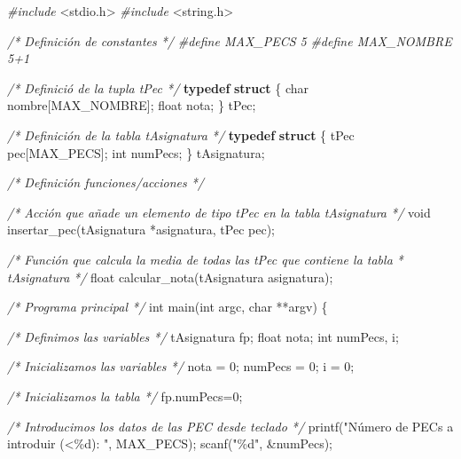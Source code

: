 \documentclass[
]{book}
\newenvironment{Shaded}{\begin{snugshade}}{\end{snugshade}}
\newcommand{\CommentTok}[1]{\textcolor[rgb]{0.56,0.35,0.01}{\textit{#1}}}
\newcommand{\DataTypeTok}[1]{\textcolor[rgb]{0.13,0.29,0.53}{#1}}
\newcommand{\DecValTok}[1]{\textcolor[rgb]{0.00,0.00,0.81}{#1}}
\newcommand{\ImportTok}[1]{#1}
\newcommand{\KeywordTok}[1]{\textcolor[rgb]{0.13,0.29,0.53}{\textbf{#1}}}
\newcommand{\NormalTok}[1]{#1}
\newcommand{\PreprocessorTok}[1]{\textcolor[rgb]{0.56,0.35,0.01}{\textit{#1}}}
\newcommand{\StringTok}[1]{\textcolor[rgb]{0.31,0.60,0.02}{#1}}
\begin{document}
\begin{Shaded}
\begin{Highlighting}[]
\PreprocessorTok{\#include }\ImportTok{\textless{}stdio.h\textgreater{}}
\PreprocessorTok{\#include }\ImportTok{\textless{}string.h\textgreater{}}

\CommentTok{/* Definición de constantes */}
\PreprocessorTok{\#define MAX\_PECS 5}
\PreprocessorTok{\#define MAX\_NOMBRE 5+1}

\CommentTok{/* Definició de la tupla tPec */}
\KeywordTok{typedef} \KeywordTok{struct}\NormalTok{ \{}
    \DataTypeTok{char}\NormalTok{ nombre[MAX\_NOMBRE];}
    \DataTypeTok{float}\NormalTok{ nota;}
\NormalTok{\} tPec;}

\CommentTok{/* Definición de la tabla tAsignatura */}
\KeywordTok{typedef} \KeywordTok{struct}\NormalTok{ \{}
\NormalTok{    tPec pec[MAX\_PECS];}
    \DataTypeTok{int}\NormalTok{ numPecs;}
\NormalTok{\} tAsignatura;}

\CommentTok{/* Definición funciones/acciones */}

\CommentTok{/* Acción que añade un elemento de tipo tPec en la tabla tAsignatura */}
\DataTypeTok{void}\NormalTok{ insertar\_pec(tAsignatura *asignatura, tPec pec);}

\CommentTok{/* Función que calcula la media de todas las tPec que contiene la tabla}
\CommentTok{ * tAsignatura }
\CommentTok{ */}
\DataTypeTok{float}\NormalTok{ calcular\_nota(tAsignatura asignatura);}

\CommentTok{/* Programa principal */} 
\DataTypeTok{int}\NormalTok{ main(}\DataTypeTok{int}\NormalTok{ argc, }\DataTypeTok{char}\NormalTok{ **argv) \{}

    \CommentTok{/* Definimos las variables */}
\NormalTok{    tAsignatura fp;}
    \DataTypeTok{float}\NormalTok{ nota;}
    \DataTypeTok{int}\NormalTok{ numPecs, i;}

    \CommentTok{/* Inicializamos las variables */}
\NormalTok{    nota = }\DecValTok{0}\NormalTok{;}
\NormalTok{    numPecs = }\DecValTok{0}\NormalTok{;}
\NormalTok{    i = }\DecValTok{0}\NormalTok{;}

    \CommentTok{/* Inicializamos la tabla */}
\NormalTok{    fp.numPecs=}\DecValTok{0}\NormalTok{;}

    \CommentTok{/* Introducimos los datos de las PEC desde teclado */}
\NormalTok{    printf(}\StringTok{"Número de PECs a introduir (\textless{}\%d): "}\NormalTok{, MAX\_PECS);}
\NormalTok{    scanf(}\StringTok{"\%d"}\NormalTok{, \&numPecs);}


\end{Highlighting}
\end{Shaded}
\end{document}
